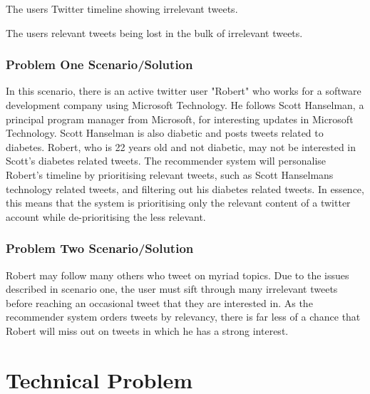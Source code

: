 \documentclass{article}
\begin{document}
\begin{itemize*}
	 \item The users Twitter timeline showing irrelevant tweets.
	 \item The users relevant tweets being lost in the bulk of irrelevant tweets.
\end{itemize*}

\subsubsection*{Problem One Scenario/Solution}
In this scenario, there is an active twitter user "Robert" who works for a software development company using Microsoft Technology. He follows Scott Hanselman, a principal program manager from Microsoft, for interesting updates in Microsoft Technology. Scott Hanselman is also diabetic and posts tweets related to diabetes. Robert, who is 22 years old and not diabetic, may not be interested in Scott's diabetes related tweets. The recommender system will personalise Robert's timeline by prioritising relevant tweets, such as Scott Hanselmans technology related tweets, and filtering out his diabetes related tweets. In essence, this means that the system is prioritising only the relevant content of a twitter account while de-prioritising the less relevant.

\subsubsection*{Problem Two Scenario/Solution}
Robert may follow many others who tweet on myriad topics. Due to the issues described in scenario one, the user must sift through many irrelevant tweets before reaching an occasional tweet that they are interested in. As the recommender system orders tweets by relevancy, there is far less of a chance that Robert will miss out on tweets in which he has a strong interest.


\section{Technical Problem}
\end{document}
